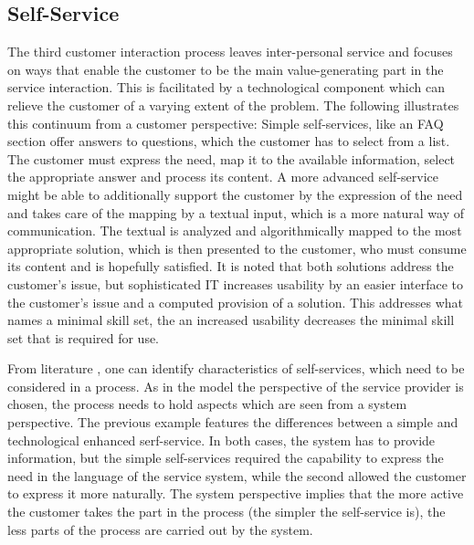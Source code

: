 	 
	 
	 
	 
	 
	 
	 
	 \subsection{Self-Service}
	 
	 The third customer interaction process leaves inter-personal service \citep{Thomas2008self} and focuses on ways that enable the customer to be the main value-generating part in the service interaction. This is facilitated by a technological component which can relieve the customer of a varying extent of the problem. The following illustrates this continuum from a customer perspective: Simple self-services, like an \acrshort{FAQ} section offer answers to questions, which the customer has to select from a list. The customer must express the need, map it to the available information, select the appropriate answer and process its content. A more advanced self-service might be able to additionally support the customer by the expression of the need and takes care of the mapping by a textual input, which is a more natural way of communication. The textual is analyzed and algorithmically mapped to the most appropriate solution, which is then presented to the customer, who must consume its content and is hopefully satisfied. It is noted that both solutions address the customer's issue, but sophisticated \acrshort{IT} increases usability by an easier interface to the customer's issue and a computed provision of a solution. This addresses what \citep{Thomas2008self} names a minimal skill set, \viz the an increased usability decreases the minimal skill set that is required for use. 
	 
	 From literature \citep{meuter2000self, Thomas2008self, Thomas:2009}, one can identify characteristics of self-services, which need to be considered in a process. As in the model the perspective of the service provider is chosen, the process needs to hold aspects which are seen from a system perspective. The previous example features the differences between a simple and technological enhanced serf-service. In both cases, the system has to provide information, but the simple self-services required the capability to express the need in the language of the service system, while the second allowed the customer to express it more naturally. The system perspective implies that the more active the customer takes the part in the process (\ie the simpler the self-service is), the less parts of the process are carried out by the system. 
	 

